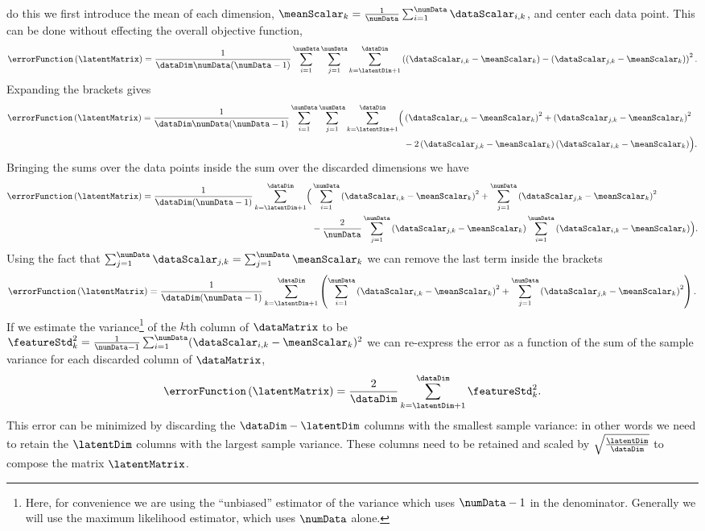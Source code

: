 do this we first introduce the mean of each dimension,
$\meanScalar_k=\frac{1}{\numData}\sum_{i=1}^{\numData}\dataScalar_{i,k}$,
and center each data point. This can be done without effecting the
overall objective function,
\[
\errorFunction\left(\latentMatrix\right)
=\frac{1}{\dataDim\numData(\numData-1)}\sum_{i=1}^{\numData}\sum_{j=1}^{\numData}\sum_{k=\latentDim+1}^{\dataDim}\left(\left(\dataScalar_{i,k}-\meanScalar_{k}\right)-\left(\dataScalar_{j,k}-\meanScalar_{k}\right)\right)^{2}.
\]
Expanding the brackets gives
\begin{align*}
\errorFunction\left(\latentMatrix\right)
=\frac{1}{\dataDim\numData(\numData-1)}\sum_{i=1}^{\numData}\sum_{j=1}^{\numData}\sum_{k=\latentDim+1}^{\dataDim}\Bigl(&\left(\dataScalar_{i,k}-\meanScalar_{k}\right)^{2}+\left(\dataScalar_{j,k}-\meanScalar_{k}\right)^{2}\\&-2\left(\dataScalar_{j,k}-\meanScalar_{k}\right)\left(\dataScalar_{i,k}-\meanScalar_{k}\right)\Bigr).
\end{align*}
Bringing the sums over the data points inside the sum over the
discarded dimensions we have
\begin{align*}
\errorFunction\left(\latentMatrix\right)
=\frac{1}{\dataDim(\numData-1)}\sum_{k=\latentDim+1}^{\dataDim}\Bigl(&\sum_{i=1}^{\numData}\left(\dataScalar_{i,k}-\meanScalar_{k}\right)^{2}+\sum_{j=1}^{\numData}\left(\dataScalar_{j,k}-\meanScalar_{k}\right)^{2}\\&-\frac{2}{\numData}\sum_{j=1}^{\numData}\left(\dataScalar_{j,k}-\meanScalar_{k}\right)\sum_{i=1}^{\numData}\left(\dataScalar_{i,k}-\meanScalar_{k}\right)\Bigr).
\end{align*}
Using the fact that $\sum_{j=1}^\numData \dataScalar_{j,k} =
\sum_{j=1}^\numData \meanScalar_k$ we can remove the last term inside
the brackets
\[
\errorFunction\left(\latentMatrix\right)
=\frac{1}{\dataDim(\numData-1)}\sum_{k=\latentDim+1}^{\dataDim}\left(\sum_{i=1}^{\numData}\left(\dataScalar_{i,k}-\meanScalar_{k}\right)^{2}+\sum_{j=1}^{\numData}\left(\dataScalar_{j,k}-\meanScalar_{k}\right)^{2}\right).
\]
If we estimate the variance\footnote{Here, for convenience we are using the ``unbiased'' estimator of the variance which uses $\numData-1$ in the denominator. Generally we will use the maximum likelihood estimator, which uses $\numData$ alone.} of the $k$th column of $\dataMatrix$
to be $\featureStd^2_k=\frac{1}{\numData-1}\sum_{i=1}^\numData
(\dataScalar_{i, k} - \meanScalar_{k})^2$ we can re-express the error
as a function of the sum of the sample variance for each discarded
column of $\dataMatrix$,
\[
\errorFunction\left(\latentMatrix\right)=\frac{2}{\dataDim}\sum_{k=\latentDim+1}^{\dataDim}\featureStd_{k}^{2}.
\]
This error can be minimized by discarding the $\dataDim-\latentDim$
columns with the smallest sample variance: in other words we need to
retain the $\latentDim$ columns with the largest sample
variance. These columns need to be retained and scaled by
$\sqrt{\frac{\latentDim}{\dataDim}}$ to compose the matrix
$\latentMatrix$.

